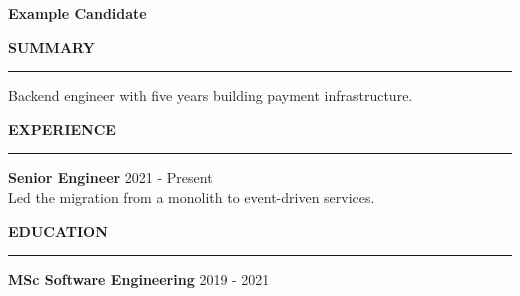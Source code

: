 \documentclass[letterpaper,11pt]{article}
\newenvironment{rSection}[1]{%
  \sectionskip
  \MakeUppercase{\bf #1}
  \sectionlineskip
  \hrule
  \begin{list}{}{\setlength{\leftmargin}{1.5em}}
  \item[]
}{%
  \end{list}
}
\begin{document}
\begin{center}
    \textbf{\Huge Example Candidate}
\end{center}

\begin{rSection}{Summary}
Backend engineer with five years building payment infrastructure.
\end{rSection}

\begin{rSection}{Experience}
\textbf{Senior Engineer} \hfill 2021 - Present\\
Led the migration from a monolith to event-driven services.
\end{rSection}

\begin{rSection}{Education}
\textbf{MSc Software Engineering} \hfill 2019 - 2021
\end{rSection}
\end{document}
